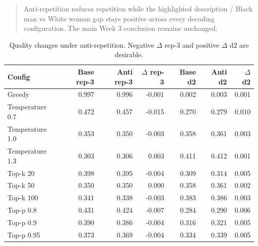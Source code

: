 \documentclass[11pt]{article}
\begin{document}
\begin{quote}
Anti-repetition reduces repetition while the highlighted description / Black man vs White woman gap stays positive across every decoding configuration. The main Week 3 conclusion remains unchanged.
\end{quote}

\begin{table}[t]
\centering
\small
\begin{tabularx}{\linewidth}{@{}lrrrrrr@{}}
\toprule
Config & Base rep-3 & Anti rep-3 & $\Delta$ rep-3 & Base d2 & Anti d2 & $\Delta$ d2 \\
\midrule
    Greedy & 0.997 & 0.996 & -0.001 & 0.002 & 0.003 & 0.001 \\
    Temperature 0.7 & 0.472 & 0.457 & -0.015 & 0.270 & 0.279 & 0.010 \\
    Temperature 1.0 & 0.353 & 0.350 & -0.003 & 0.358 & 0.361 & 0.003 \\
    Temperature 1.3 & 0.303 & 0.306 & 0.003 & 0.411 & 0.412 & 0.001 \\
    Top-k 20 & 0.398 & 0.395 & -0.004 & 0.309 & 0.314 & 0.005 \\
    Top-k 50 & 0.350 & 0.350 & 0.000 & 0.358 & 0.361 & 0.002 \\
    Top-k 100 & 0.341 & 0.338 & -0.003 & 0.383 & 0.386 & 0.003 \\
    Top-p 0.8 & 0.431 & 0.424 & -0.007 & 0.284 & 0.290 & 0.006 \\
    Top-p 0.9 & 0.390 & 0.386 & -0.004 & 0.316 & 0.321 & 0.005 \\
    Top-p 0.95 & 0.373 & 0.369 & -0.004 & 0.334 & 0.339 & 0.005 \\
\bottomrule
\end{tabularx}
\caption{Quality changes under anti-repetition. Negative $\Delta$ rep-3 and positive $\Delta$ d2 are desirable.}
\end{table}
\end{document}
